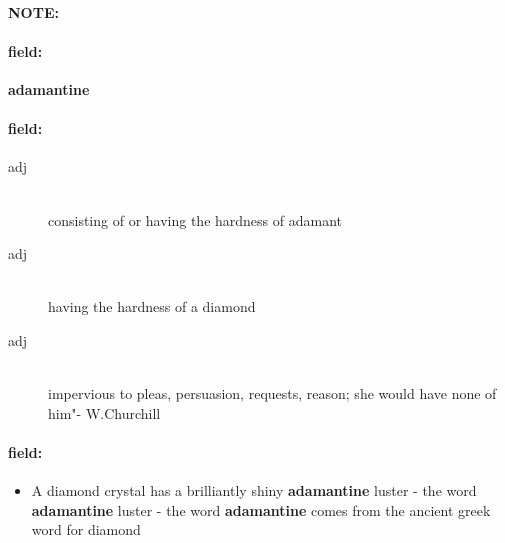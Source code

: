 \documentclass[12pt]{article}
\newenvironment{note}{\paragraph{NOTE:}}{}
\newenvironment{field}{\paragraph{field:}}{}
\begin{document}
\begin{note}
\begin{field}
\textbf{\large adamantine}
\end{field}


\begin{field}
\begin{description}
\item[adj] \hfill \\ 
consisting of or having the hardness of adamant

\item[adj] \hfill \\ 
having the hardness of a diamond

\item[adj] \hfill \\ 
impervious to pleas, persuasion, requests, reason; she would have none of him"- W.Churchill

\end{description}
\end{field}

\begin{field}
\begin{itemize}
\item A diamond crystal has a brilliantly shiny \textbf{adamantine} luster - the word \textbf{adamantine} luster - the word \textbf{adamantine} comes from the ancient greek word for diamond
\end{itemize}
\end{field}
\end{note}
\end{document}

